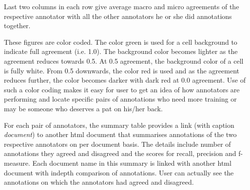 Last two columns in each row give average macro and micro agreements of the
respective annotator with all the other annotators he or she did annotations 
together.

These figures are color coded. The color green is used for a cell background to 
indicate full agreement (i.e. 1.0). The background color becomes lighter as the 
agreement reduces towards 0.5.  At 0.5 agreement, the background color of a cell
is fully white. From 0.5 downwards, the color red is used and as the agreement 
reduces further, the color becomes darker with dark red at 0.0 agreement.  Use 
of such a color coding makes it easy for user to get an idea of how annotators 
are performing and locate specific pairs of annotations who need more training 
or may be someone who deserves a pat on his/her back.

For each pair of annotators, the summary table provides a link (with caption 
\textit{document}) to another html document that summarises annotations of the
two respective annotators on per document basis.  The details include number of
annotations they agreed and disagreed and the scores for recall, precision and 
f-measure.  Each document name in this summary is linked with another html 
document with indepth comparison of annotations.  User can actually see the 
annotations on which the annotators had agreed and disagreed.


%
%

%



